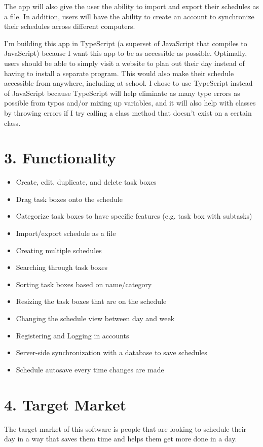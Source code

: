 \documentclass[12pt, notitlepage]{report}
\begin{document}
The app will also give the user the ability to import and export their schedules as a file.
In addition, users will have the ability to create an account to synchronize their schedules across different computers.

I'm building this app in TypeScript (a superset of JavaScript that compiles to JavaScript) because I want this app to be as accessible as possible.
Optimally, users should be able to simply visit a website to plan out their day instead of having to install a separate program.
This would also make their schedule accessible from anywhere, including at school.
I chose to use TypeScript instead of JavaScript because TypeScript will help eliminate as many type errors as possible from typos and/or mixing up variables, and it will also help with classes by throwing errors if I try calling a class method that doesn't exist on a certain class.

\section*{3. Functionality}
\begin{itemize}
	\item Create, edit, duplicate, and delete task boxes
	\item Drag task boxes onto the schedule
	\item Categorize task boxes to have specific features (e.g. task box with subtasks)
	\item Import/export schedule as a file
	\item Creating multiple schedules
	\item Searching through task boxes
	\item Sorting task boxes based on name/category
	\item Resizing the task boxes that are on the schedule
	\item Changing the schedule view between day and week
	\item Registering and Logging in accounts
	\item Server-side synchronization with a database to save schedules
	\item Schedule autosave every time changes are made
\end{itemize}

\section*{4. Target Market}
The target market of this software is people that are looking to schedule their day in a way that saves them time and helps them get more done in a day.
\end{document}
